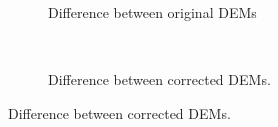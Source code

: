 \documentclass{sfuthesis}
\begin{document}
{\begin{figure}[H]
    \centering
    \begin{subfigure}[b]{0.48\textwidth}
        \caption{Difference between original DEMs}
        \label{fig:DEMdifferenceOriginal}
    \end{subfigure}
    ~
    \begin{subfigure}[b]{0.48\textwidth}
        \caption{Difference between corrected DEMs.}
        \label{fig:DEMdifferenceCorrected}
    \end{subfigure}


\end{figure}}
\end{document}
